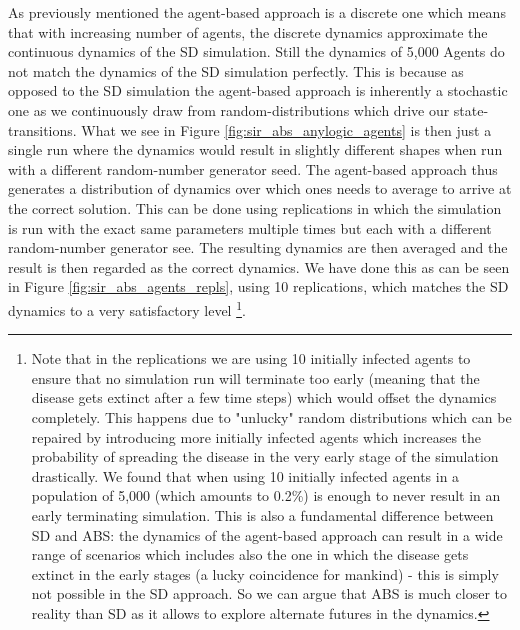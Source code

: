 As previously mentioned the agent-based approach is a discrete one which means that with increasing number of agents, the discrete dynamics approximate the continuous dynamics of the SD simulation. Still the dynamics of 5,000 Agents do not match the dynamics of the SD simulation perfectly. This is because as opposed to the SD simulation the agent-based approach is inherently a stochastic one as we continuously draw from random-distributions which drive our state-transitions. What we see in Figure \ref{fig:sir_abs_anylogic_agents} is then just a single run where the dynamics would result in slightly different shapes when run with a different random-number generator seed. The agent-based approach thus generates a distribution of dynamics over which ones needs to average to arrive at the correct solution. This can be done using replications in which the simulation is run with the exact same parameters multiple times but each with a different random-number generator see. The resulting dynamics are then averaged and the result is then regarded as the correct dynamics.
We have done this as can be seen in Figure \ref{fig:sir_abs_agents_repls}, using 10 replications, which matches the SD dynamics to a very satisfactory level \footnote{Note that in the replications we are using 10 initially infected agents to ensure that no simulation run will terminate too early (meaning that the disease gets extinct after a few time steps) which would offset the dynamics completely. This happens due to "unlucky" random distributions which can be repaired by introducing more initially infected agents which increases the probability of spreading the disease in the very early stage of the simulation drastically. We found that when using 10 initially infected agents in a population of 5,000 (which amounts to 0.2\%) is enough to never result in an early terminating simulation. This is also a fundamental difference between SD and ABS: the dynamics of the agent-based approach can result in a wide range of scenarios which includes also the one in which the disease gets extinct in the early stages (a lucky coincidence for mankind) - this is simply not possible in the SD approach. So we can argue that ABS is much closer to reality than SD as it allows to explore alternate futures in the dynamics.}.

